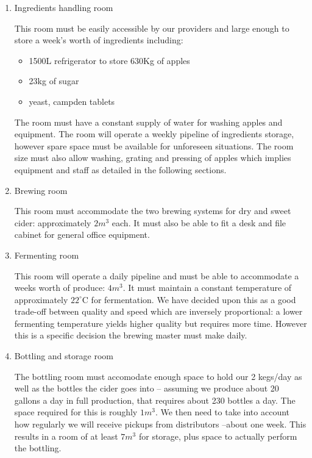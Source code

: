 \documentclass[11pt]{article}
\begin{document}
  \begin{enumerate}
  \item Ingredients handling room

This room must be easily accessible by our providers and large enough to store a
week's worth of ingredients including:

    \begin{itemize}
    \item 1500L refrigerator to store 630Kg of apples
    \item 23kg of sugar
    \item yeast, campden tablets
    \end{itemize}

The room must have a constant supply of water for washing apples and equipment.
The room will operate a weekly pipeline of ingredients storage, however spare
space must be available for unforeseen situations. The room size must also allow
 washing, grating and pressing of apples which implies equipment and staff as
detailed in the following sections.

  \item Brewing room

This room must accommodate the two brewing systems for dry and sweet cider:
approximately $2m^3$ each. It must also be able to fit a desk and file cabinet
for general office equipment.

  \item Fermenting room

This room will operate a daily pipeline and must be able to accommodate a weeks
 worth of produce: $4m^3$. It must maintain a constant temperature of
approximately $22^\circ$C for fermentation. We have decided upon this as a good
trade-off between quality and speed which are inversely proportional: a lower
fermenting temperature yields higher quality but requires more time. However
this is a specific decision the brewing master must make daily.

  \item Bottling and storage room

The bottling room must accomodate enough space to hold our 2 kegs/day as well
as the bottles the cider goes into -- assuming we produce about 20 gallons a
day in full production, that requires about 230 bottles a day. The space
required for this is roughly $1m^3$. We then need to take into account how
regularly we will receive pickups from distributors --about one week. This
results in a room of at least $7m^3$ for storage, plus space to actually perform
the bottling.


\end{enumerate}
\end{document}
